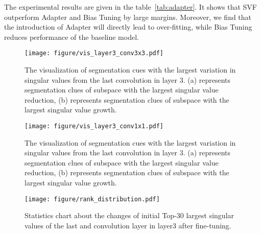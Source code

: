 \documentclass{article}
\begin{document}
The experimental results are given in the table~\ref{tab:adapter}. It shows that SVF outperform Adapter and Bias Tuning by large margins. Moreover, we find that the introduction of Adapter will directly lead to over-fitting, while Bias Tuning reduces performance of the baseline model.
\begin{figure*}
	\centering
	\setlength{\abovecaptionskip}{0.cm}
	\texttt{[image: figure/vis\_layer3\_conv3x3.pdf]}
	\vspace{-.4em}
	\caption{The visualization of segmentation cues with the largest variation in singular values from the last  convolution in layer 3. (a) represents segmentation clues of subspace  with the largest singular value reduction, (b) represents segmentation clues of subspace  with the largest singular value growth.}
	\label{fig:vis_3x3}
	\vspace{-0.4cm}
\end{figure*}

\begin{figure*}
	\centering
	\setlength{\abovecaptionskip}{0.cm}
	\texttt{[image: figure/vis\_layer3\_conv1x1.pdf]}
	\vspace{-.4em}
	\caption{The visualization of segmentation cues with the largest variation in singular values from the last  convolution in layer 3. (a) represents segmentation clues of subspace  with the largest singular value reduction, (b) represents segmentation clues of subspace  with the largest singular value growth.}
	
	\label{fig:vis_1x1}
	\vspace{-0.6cm}
\end{figure*}
\vspace{-.9em}



\begin{wrapfigure}{r}{7.5cm}
    \vspace{-0.3cm}
	\centering
	\setlength{\abovecaptionskip}{-0.3cm}
	\texttt{[image: figure/rank\_distribution.pdf]}
	\caption{Statistics chart about the changes of initial Top-30 largest singular values of the last  and  convolution layer in layer3 after fine-tuning.}
	\label{fig:scale_change}
	\vspace{-0.4cm}
\end{wrapfigure}



\vspace{-.4em}
\end{document}
